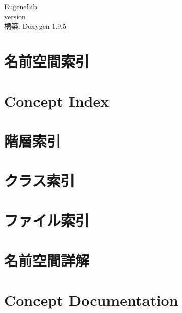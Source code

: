 \documentclass[twoside]{book}
\newcommand{\+}{\discretionary{\mbox{\scriptsize$\hookleftarrow$}}{}{}}
\newcommand{\clearemptydoublepage}{%
    \newpage{\pagestyle{empty}\cleardoublepage}%
  }
\begin{document}
  \raggedbottom
  \begin{CJK}{UTF8}{min}
    \hypersetup{pageanchor=false,
                bookmarksnumbered=true,
                pdfencoding=unicode
               }
  \begin{titlepage}
  \vspace*{7cm}
  \begin{center}%
  {\Large Eugene\+Lib}\\
  [1ex]\large version \\
  \vspace*{1cm}
  {\large 構築\+: Doxygen 1.9.5}\\
  \end{center}
  \end{titlepage}
  \clearemptydoublepage
  \tableofcontents
  \clearemptydoublepage
  \hypersetup{pageanchor=true}
\chapter{名前空間索引}

\chapter{Concept Index}

\chapter{階層索引}

\chapter{クラス索引}

\chapter{ファイル索引}

\chapter{名前空間詳解}








\chapter{Concept Documentation}


\end{CJK}
\end{document}
